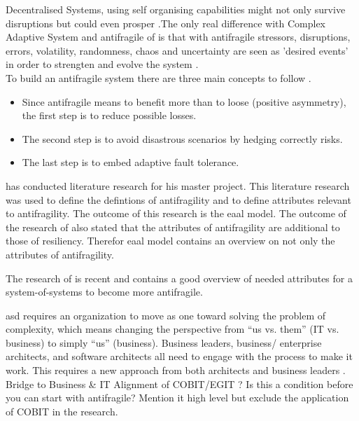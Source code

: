 Decentralised Systems, using self organising capabilities might not only survive disruptions but could even prosper \parencite{Brafman2007}.The only real difference with Complex Adaptive System and antifragile of \textcite{Taleb2012} is that with antifragile stressors, disruptions, errors, volatility, randomness, chaos and uncertainty are seen as 'desired events' in order to strengten and evolve the system \parencite{Jaaron2014}.\\

To build an antifragile system there are three main concepts to follow \parencite{Russo2017}.
\begin{itemize}
	\item{Since antifragile means to benefit more than to loose (positive asymmetry), the first step is to reduce possible losses.}
	\item{The second step is to avoid disastrous scenarios by hedging correctly risks.}
	\item{The last step is to embed adaptive fault tolerance.}
\end{itemize}

\textcite{Botjes2020} has conducted literature research for his master project. This literature research was used to define the defintions of \gls{antifragility} and to define attributes relevant to \gls{antifragility}. The outcome of this research is the \acrfull{eaal} model. The outcome of the research of \textcite{Botjes2020} also stated that the attributes of \gls{antifragility} are additional to those of \gls{resiliency}. Therefor \acrshort{eaal} model contains an overview on not only the attributes of \gls{antifragility}.

The research of \textcite{Botjes2020} is recent and contains a good overview of needed attributes for a system-of-systems to become more \gls{antifragile}.

\acrfull{asd} \parencite[p. 886-888]{OReilly2019} requires an organization to move as one toward solving the problem of complexity, which means changing the perspective from “us vs. them” (IT vs. business) to simply “us” (business). Business leaders, business/ enterprise architects, and software architects all need to engage with the process to make it work. This requires a new approach from both architects and business leaders \parencite[p. 886]{OReilly2019}. Bridge to Business \& IT Alignment of COBIT/EGIT \parencite{DeHaes2020}? Is this a condition before you can start with antifragile? Mention it high level but exclude the application of COBIT in the research.

